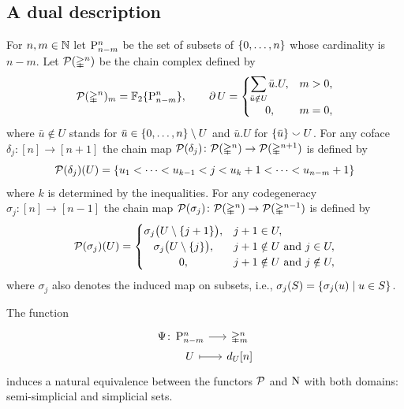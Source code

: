 \subsection{A dual description}\label{ss:equivalence_of_functors}

For $n,m \in \N$ let $\P_{n-m}^n$ be the set of subsets of $\set{0,\dots,n}$ whose cardinality is $n-m$.
Let $\cP(\simplex^n)$ be the chain complex defined by
\[
\cP(\simplex^n)_m = \Ftwo\set{\P_{n-m}^n}, \qquad
\bd U =
\begin{cases}
	\displaystyle\sum_{\mathclap{\bar{u} \notin U}} \bar{u}.U, & m>0, \\
	\hfil 0, & m=0,
\end{cases}
\]
where $\bar{u} \notin U$ stands for $\bar{u} \in \set{0,\dots,n} \setminus U$ and $\bar{u}.U$ for $\set{\bar{u}} \union U$.
For any coface $\delta_j \colon [n] \to [n+1]$ the chain map $\cP(\delta_j) \colon \cP(\simplex^n) \to \cP(\simplex^{n+1})$ is defined by
\[
\cP(\delta_j)(U) = \set{u_1 < \dots < u_{k-1} < j < u_k+1 < \dots < u_{n-m}+1}
\]
where $k$ is determined by the inequalities.
For any codegeneracy $\sigma_j \colon [n] \to [n-1]$ the chain map $\cP(\sigma_j) \colon \cP(\simplex^n) \to \cP(\simplex^{n-1})$ is defined by
\begin{equation}\label{eq:codegeneracies}
	\cP(\sigma_j)(U) =
	\begin{cases}
		\sigma_j\big(U \setminus \{j+1\}\big), & j+1 \in U, \\
		\hfil \sigma_j\big(U \setminus \{j\}\big), & j+1 \notin U \text{ and } j \in U, \\
		\hfil 0, & j+1 \notin U \text{ and } j \notin U,
	\end{cases}
\end{equation}
where $\sigma_j$ also denotes the induced map on subsets, i.e., $\sigma_j(S) = \set{\sigma_j(u) \mid u \in S}$.

\begin{lemma}\label{st:chains_functor_equivalence}
	The function
	\[
	\begin{tikzcd}[column sep=small,row sep=0]
		\Psi \colon &[-19] \P_{n-m}^n \rar & \simplex^n_m \\
		& U \rar[mapsto] & d_U [n]
	\end{tikzcd}
	\]
	induces a natural equivalence between the functors $\cP$ and $\chains$ with both domains: semi-simplicial and simplicial sets.
\end{lemma}

